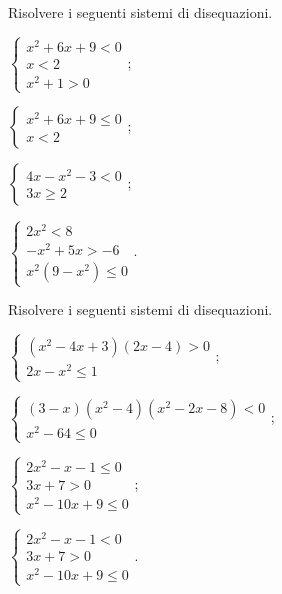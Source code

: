 \begin{esercizio}[\Ast]
 \label{ese:4.75}
Risolvere i seguenti sistemi di disequazioni.
\begin{multicols}{2}
\begin{enumeratea}
\item $\left\{\begin{array}{l}x^2+6x+9<0\\x<2\\x^2+1>0\end{array}\right.$;
\item $\left\{\begin{array}{l}x^2+6x+9\le 0\\x<2\end{array}\right.$;
\item $\left\{\begin{array}{l}4x-x^2-3<0\\3x\ge 2\end{array}\right.$;
\item $\left\{\begin{array}{l}2x^2<8\\-x^2+5x>-6\\x^2(9-x^2)\le 0\end{array}\right.$.
\end{enumeratea}
\end{multicols}
\end{esercizio}

\begin{esercizio}[\Ast]
 \label{ese:4.76}
Risolvere i seguenti sistemi di disequazioni.
\begin{multicols}{2}
\begin{enumeratea}
\item $\left\{\begin{array}{l}(x^2-4x+3)(2x-4)>0\\2x-x^2\le 1\end{array}\right.$;
\item $\left\{\begin{array}{l}(3-x)(x^2-4)(x^2-2x-8)<0\\x^2-64\le 0\end{array}\right.$;
\item $\left\{\begin{array}{l}2x^2-x-1\le 0\\3x+7>0\\x^2-10x+9\le 0\end{array}\right.$;
\item $\left\{\begin{array}{l}2x^2-x-1<0\\3x+7>0\\x^2-10x+9\le 0\end{array}\right.$.
\end{enumeratea}
\end{multicols}
\end{esercizio}

